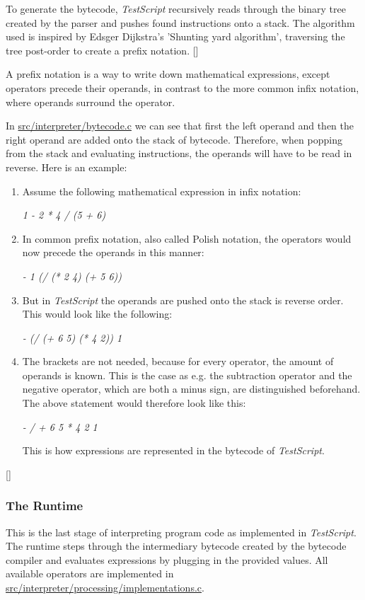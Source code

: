 \documentclass[12pt,a4paper]{article}
\newcommand{\hrc}[1]{\hyperref[#1]{#1}}
\newcommand{\expr}[1] {
    \begin{center}
        #1
    \end{center}
}
\newcommand{\name}{\emph{TestScript}}
\begin{document}
To generate the bytecode, \name{} recursively reads through the
binary tree created by the parser and pushes found instructions onto a stack.
The algorithm used is inspired by Edsger Dijkstra's 'Shunting yard 
algorithm', traversing the tree post-order to create
a prefix notation. 
[]

A prefix notation is a way to write down mathematical expressions, except
operators precede their operands, in contrast to the more common infix notation,
where operands surround the operator.

In \hrc{src/interpreter/bytecode.c} we can see that first the left operand and then
the right operand are added onto the stack of bytecode. Therefore, when
popping from the stack and evaluating instructions, the operands will have to
be read in reverse.
Here is an example:
\begin{enumerate}
    \item Assume the following mathematical expression in infix notation:
        \expr{\emph{1 - 2 * 4 / (5 + 6)}}
    \item In common prefix notation, also called Polish notation, the
        operators would now precede the operands in this manner:
        \expr{\emph{- 1 (/ (* 2 4) (+ 5 6))}}
    \item But in \name{} the operands are pushed onto the stack is reverse order.
        This would look like the following:
        \expr{\emph{- (/ (+ 6 5) (* 4 2)) 1}}
    \item The brackets are not needed, because for every operator, the amount
        of operands is known. This is the case as e.g. the subtraction operator
        and the negative operator, which are both a minus sign, are distinguished
        beforehand. The above statement would therefore look like this:
        \expr{\emph{- / + 6 5 * 4 2 1}}
        This is how expressions are represented in the bytecode of \name{}.
\end{enumerate}
[]

\subsubsection{The Runtime}
This is the last stage of interpreting program code as implemented in \name{}.
The runtime steps through the intermediary bytecode created by the bytecode
compiler and evaluates expressions by plugging in the provided values.
All available operators are implemented in 
\hrc{src/interpreter/processing/implementations.c}.
\end{document}
